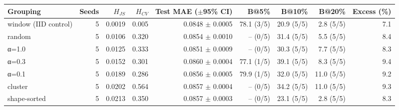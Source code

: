 \begin{tabular}{lrrrrrrrr}
\toprule
Grouping & Seeds & $H_{JS}$ & $H_{CV}$ & Test MAE ($\pm$95\% CI) & B@5\% & B@10\% & B@20\% & Excess (\%) \\
\midrule
window (IID control) & 5 & 0.0019 & 0.005 & 0.0848 $\pm$ 0.0005 & 78.1 (3/5) & 20.9 (5/5) & 2.8 (5/5) & 7.1 \\
random & 5 & 0.0106 & 0.320 & 0.0854 $\pm$ 0.0010 & -- (0/5) & 31.4 (5/5) & 5.5 (5/5) & 8.4 \\
α=1.0 & 5 & 0.0125 & 0.333 & 0.0851 $\pm$ 0.0009 & -- (0/5) & 30.3 (5/5) & 7.7 (5/5) & 8.3 \\
α=0.3 & 5 & 0.0152 & 0.301 & 0.0860 $\pm$ 0.0004 & 77.1 (1/5) & 39.1 (5/5) & 8.3 (5/5) & 9.4 \\
α=0.1 & 5 & 0.0189 & 0.286 & 0.0856 $\pm$ 0.0005 & 79.9 (1/5) & 32.0 (5/5) & 11.0 (5/5) & 9.2 \\
cluster & 5 & 0.0202 & 0.564 & 0.0857 $\pm$ 0.0004 & -- (0/5) & 34.2 (5/5) & 11.0 (5/5) & 9.3 \\
shape-sorted & 5 & 0.0213 & 0.350 & 0.0857 $\pm$ 0.0003 & -- (0/5) & 23.1 (5/5) & 2.8 (5/5) & 8.3 \\
\bottomrule
\end{tabular}
